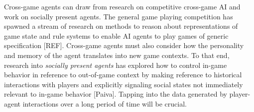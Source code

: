 \documentclass[conference]{IEEEtran}
\newcommand{\mytodo}[1]{\textbf{[[#1]]}}
\begin{document}
Cross-game agents can draw from research on competitive cross-game AI and work on socially present agents. The general game playing competition has spawned a stream of research on methods to reason about representations of game state and rule systems to enable AI agents to play games of generic specification [REF].
Cross-game agents must also consider how the personality and memory of the agent translates into new game contexts.
To that end, research into {\em socially present agents} has explored how to control in-game behavior in reference to out-of-game context by making reference to historical interactions with players and explicitly signaling social states not immediately relevant to in-game behavior [Paiva].
Tapping into the data generated by player-agent interactions over a long period of time will be crucial. 
%
%
%
%
\end{document}

